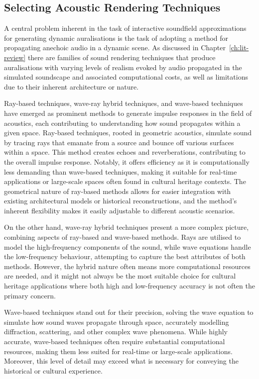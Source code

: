 \subsection{Selecting Acoustic Rendering Techniques}
A central problem inherent in the task of interactive soundfield approximations for generating dynamic auralisations is the task of adopting a method for propagating anechoic audio in a dynamic scene. As discussed in Chapter~\ref{ch:lit-review} there are families of sound rendering techniques that produce auralisations with varying levels of realism evoked by audio propagated in the simulated soundscape and associated computational costs, as well as limitations due to their inherent architecture or nature.

Ray-based techniques, wave-ray hybrid techniques, and wave-based techniques have emerged as prominent methods to generate impulse responses in the field of acoustics, each contributing to understanding how sound propagates within a given space. Ray-based techniques, rooted in geometric acoustics, simulate sound by tracing rays that emanate from a source and bounce off various surfaces within a space. This method creates echoes and reverberations, contributing to the overall impulse response. Notably, it offers efficiency as it is computationally less demanding than wave-based techniques, making it suitable for real-time applications or large-scale spaces often found in cultural heritage contexts. The geometrical nature of ray-based methods allows for easier integration with existing architectural models or historical reconstructions, and the method's inherent flexibility makes it easily adjustable to different acoustic scenarios. %

On the other hand, wave-ray hybrid techniques present a more complex picture, combining aspects of ray-based and wave-based methods. Rays are utilised to model the high-frequency components of the sound, while wave equations handle the low-frequency behaviour, attempting to capture the best attributes of both methods. However, the hybrid nature often means more computational resources are needed, and it might not always be the most suitable choice for cultural heritage applications where both high and low-frequency accuracy is not often the primary concern.  %

Wave-based techniques stand out for their precision, solving the wave equation to simulate how sound waves propagate through space, accurately modelling diffraction, scattering, and other complex wave phenomena. While highly accurate, wave-based techniques often require substantial computational resources, making them less suited for real-time or large-scale applications. Moreover, this level of detail may exceed what is necessary for conveying the historical or cultural experience.


